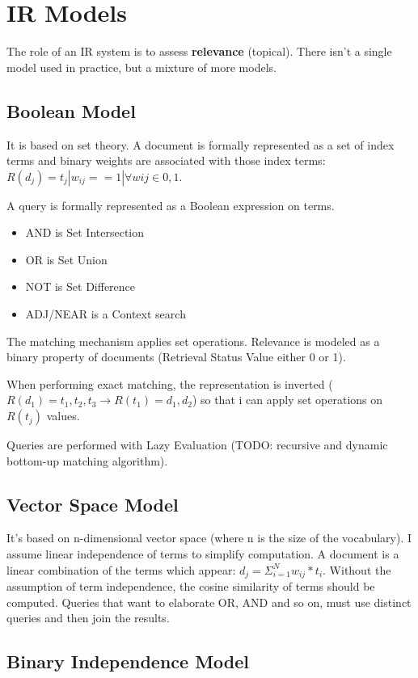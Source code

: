 \chapter{IR Models}

The role of an IR system is to assess \textbf{relevance} (topical).
There isn't a single model used in practice, but a mixture of more models.

\section{Boolean Model}

It is based on set theory.
A document is formally represented as a set of index terms and binary weights are associated with those index terms: $R(d_j) = { t_j | w_{ij} == 1 | \forall wij \in {0,1}}$.

A query is formally represented as a Boolean expression on terms.
\begin{itemize}
  \item AND is Set Intersection
  \item OR is Set Union
  \item NOT is Set Difference
  \item ADJ/NEAR is a Context search
\end{itemize}
The matching mechanism applies set operations.
Relevance is modeled as a binary property of documents (Retrieval Status Value either 0 or 1).

When performing exact matching, the representation is inverted ($R(d_1) = {t_1, t_2, t_3} \rightarrow R(t_1) = {d_1, d_2}$) so that i can apply set operations on $R(t_j)$ values.

Queries are performed with Lazy Evaluation (TODO: recursive and dynamic bottom-up matching algorithm).

\section{Vector Space Model}

It's based on n-dimensional vector space (where n is the size of the  vocabulary).
I assume linear independence of terms to simplify computation.
A document is a linear combination of the terms which appear: $d_j = \Sigma ^{N} _{i = 1} w_{ij} * t_i$.
Without the assumption of term independence, the cosine similarity of terms should be computed.
Queries that want to elaborate OR, AND and so on, must use distinct queries and then join the results.

\section{Binary Independence Model}

